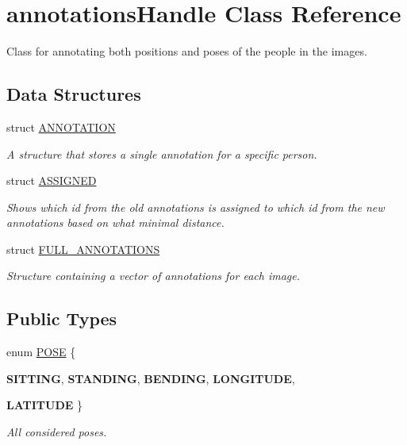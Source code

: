 \hypertarget{classannotationsHandle}{
\section{annotationsHandle Class Reference}
\label{classannotationsHandle}
}


Class for annotating both positions and poses of the people in the images.  


\subsection*{Data Structures}
\begin{DoxyCompactItemize}
\item 
struct \hyperlink{structannotationsHandle_1_1ANNOTATION}{ANNOTATION}
\begin{DoxyCompactList}\small\item\em A structure that stores a single annotation for a specific person. \item\end{DoxyCompactList}\item 
struct \hyperlink{structannotationsHandle_1_1ASSIGNED}{ASSIGNED}
\begin{DoxyCompactList}\small\item\em Shows which id from the old annotations is assigned to which id from the new annotations based on what minimal distance. \item\end{DoxyCompactList}\item 
struct \hyperlink{structannotationsHandle_1_1FULL__ANNOTATIONS}{FULL\_\-ANNOTATIONS}
\begin{DoxyCompactList}\small\item\em Structure containing a vector of annotations for each image. \item\end{DoxyCompactList}\end{DoxyCompactItemize}
\subsection*{Public Types}
\begin{DoxyCompactItemize}
\item 
enum \hyperlink{classannotationsHandle_a7a9e324ff6c85eeb2c2bd91b2b8cbdba}{POSE} \{ \par
{\bfseries SITTING}, 
{\bfseries STANDING}, 
{\bfseries BENDING}, 
{\bfseries LONGITUDE}, 
\par
{\bfseries LATITUDE}
 \}
\begin{DoxyCompactList}\small\item\em All considered poses. \item\end{DoxyCompactList}\end{DoxyCompactItemize}
